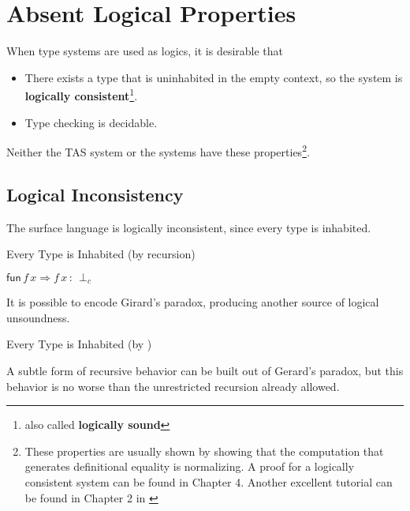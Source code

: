 \section{Absent Logical Properties}
 
When type systems are used as logics, it is desirable that
\begin{itemize}
\item There exists a type that is uninhabited in the empty context, so the system is \textbf{logically consistent}\footnote{also called \textbf{logically sound}}.
\item Type checking is decidable.
\end{itemize}
Neither the \ac{TAS} system or the \Bidir{} systems have these properties\footnote{
 These properties are usually shown by showing that the computation that generates definitional equality is normalizing.
 A proof for a logically consistent system can be found in Chapter 4\cite{luo1994computation}.
 Another excellent tutorial can be found in Chapter 2 in \cite{casinghino2014combiningthesis}}.
 
\subsection{Logical Inconsistency}
 
The surface language is logically inconsistent, since every type is inhabited.
 
\begin{example}
Every Type is Inhabited (by recursion)
 
$\mathsf{fun}\,f\,x\Rightarrow f\,x\,:\,\perp_{c}$
\end{example}
 
It is possible to encode Girard's paradox, producing another source of logical unsoundness.
\begin{example}
Every Type is Inhabited (by \tit{})
 
 
\end{example}
 
A subtle form of recursive behavior can be built out of Gerard's paradox\cite{Reinhold89typecheckingis}, but this behavior is no worse than the unrestricted recursion already allowed.
 
